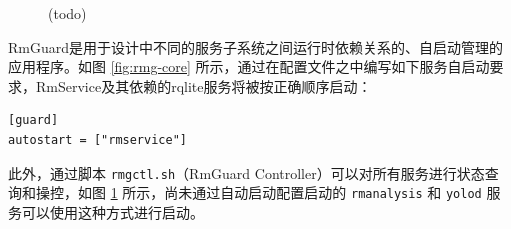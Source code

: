 \begin{figure}[htbp]
    \hfill
    \vspace{1em}
    \hfill
	\caption{(todo)}
	\label{fig:rmg-service}
\end{figure}

RmGuard是用于设计中不同的服务子系统之间运行时依赖关系的、自启动管理的应用程序。如图 \ref{fig:rmg-core} 所示，通过在配置文件之中编写如下服务自启动要求，RmService及其依赖的rqlite服务将被按正确顺序启动：

\begin{verbatim}
[guard]
autostart = ["rmservice"]
\end{verbatim}

此外，通过脚本 \verb|rmgctl.sh|（RmGuard Controller）可以对所有服务进行状态查询和操控，如图 \ref{fig:rmg-service} 所示，尚未通过自动启动配置启动的 \verb|rmanalysis| 和 \verb|yolod| 服务可以使用这种方式进行启动。

